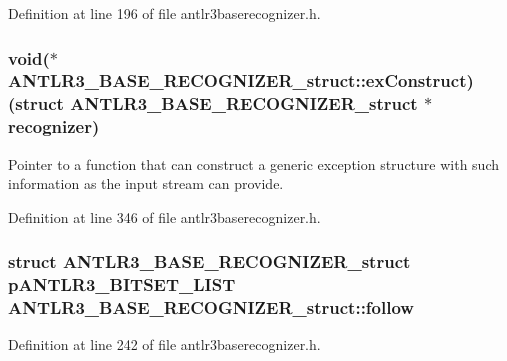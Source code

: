 Definition at line 196 of file antlr3baserecognizer.\-h.

\hypertarget{struct_a_n_t_l_r3___b_a_s_e___r_e_c_o_g_n_i_z_e_r__struct_aeb9618e34a17218f524e0b70158285e3}{
\subsubsection[{ex\-Construct}]{\setlength{\rightskip}{0pt plus 5cm}void($\ast$ A\-N\-T\-L\-R3\-\_\-\-B\-A\-S\-E\-\_\-\-R\-E\-C\-O\-G\-N\-I\-Z\-E\-R\-\_\-struct\-::ex\-Construct)(struct {\bf A\-N\-T\-L\-R3\-\_\-\-B\-A\-S\-E\-\_\-\-R\-E\-C\-O\-G\-N\-I\-Z\-E\-R\-\_\-struct} $\ast${\bf recognizer})}}\label{struct_a_n_t_l_r3___b_a_s_e___r_e_c_o_g_n_i_z_e_r__struct_aeb9618e34a17218f524e0b70158285e3}
Pointer to a function that can construct a generic exception structure with such information as the input stream can provide. 

Definition at line 346 of file antlr3baserecognizer.\-h.

\hypertarget{struct_a_n_t_l_r3___b_a_s_e___r_e_c_o_g_n_i_z_e_r__struct_a7bff9fe6af6e7c6ddccd99de75fb034b}{
\subsubsection[{follow}]{\setlength{\rightskip}{0pt plus 5cm}struct {\bf A\-N\-T\-L\-R3\-\_\-\-B\-A\-S\-E\-\_\-\-R\-E\-C\-O\-G\-N\-I\-Z\-E\-R\-\_\-struct} {\bf p\-A\-N\-T\-L\-R3\-\_\-\-B\-I\-T\-S\-E\-T\-\_\-\-L\-I\-S\-T} A\-N\-T\-L\-R3\-\_\-\-B\-A\-S\-E\-\_\-\-R\-E\-C\-O\-G\-N\-I\-Z\-E\-R\-\_\-struct\-::follow}}\label{struct_a_n_t_l_r3___b_a_s_e___r_e_c_o_g_n_i_z_e_r__struct_a7bff9fe6af6e7c6ddccd99de75fb034b}


Definition at line 242 of file antlr3baserecognizer.\-h.

